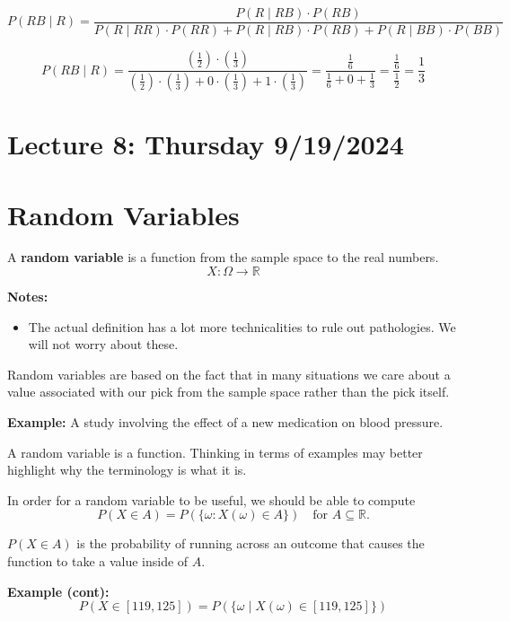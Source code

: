 \documentclass{article}
\begin{document}
    \[
        P(RB \mid R) = \frac{P(R \mid RB) \cdot P(RB)}{P(R \mid RR) \cdot P(RR) + P(R \mid RB) \cdot P(RB) + P(R \mid BB) \cdot P(BB)}
    \]

    \[
        P(RB \mid R) = \frac{\left(\frac{1}{2}\right) \cdot \left(\frac{1}{3}\right)}{\left(\frac{1}{2}\right) \cdot \left(\frac{1}{3}\right) + 0 \cdot \left(\frac{1}{3}\right) + 1 \cdot \left(\frac{1}{3}\right)} = \frac{\frac{1}{6}}{\frac{1}{6} + 0 + \frac{1}{3}} = \frac{\frac{1}{6}}{\frac{1}{2}} = \boxed{\frac{1}{3}}
    \]

    \pagebreak

    \section*{Lecture 8: Thursday 9/19/2024}

    \section*{Random Variables}

    A \textbf{random variable} is a function from the sample space to the real numbers.
    \[
        X : \Omega \to \mathbb{R}
    \]

    \textbf{Notes:}
    \begin{itemize}
        \item The actual definition has a lot more technicalities to rule out pathologies. We will not worry about these.
    \end{itemize}

    Random variables are based on the fact that in many situations we care about a value associated with our pick from the sample space rather than the pick itself.

    \textbf{Example:} A study involving the effect of a new medication on blood pressure.

    A random variable is a function. Thinking in terms of examples may better highlight why the terminology is what it is.

    In order for a random variable to be useful, we should be able to compute 
    \[
        P(X \in A) = P(\{\omega : X(\omega) \in A\}) \quad \text{for } A \subseteq \mathbb{R}.
    \]
   

    \(P(X \in A)\) is the probability of running across an outcome that causes the function to take a value inside of \(A\).

    \textbf{Example (cont):}
    \[
        P(X \in [119, 125]) = P(\{\omega \mid X(\omega) \in [119, 125]\})
    \]
\end{document}
